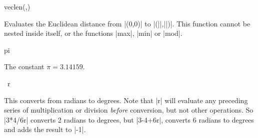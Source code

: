 \begin{math-function}{veclen(,)}

	Evaluates the Euclidean distance from |(0,0)| to |(||,||)|. 
	This function cannot be nested inside itself, or the functions |max|,
	|min| or |mod|.

\begin{codeexample}[post=\tt\footnotesize\pgfmathresult]
\end{codeexample}

\begin{codeexample}[post=\tt\footnotesize\pgfmathresult]
\end{codeexample}

\end{math-function}

\begin{math-constant}{pi}

	The constant $\pi=3.14159$.
	
\begin{codeexample}[post=\tt\footnotesize\pgfmathresult]
\end{codeexample}

\begin{codeexample}[post=\tt\footnotesize\pgfmathresult]
\end{codeexample}

\end{math-constant}

\begin{math-operator}{\ r}

	This converts  from radians to degrees. Note that |r| will 
	evaluate any preceding series of multiplication or division 
	\emph{before} conversion, but not other operations. So |3*4/6r| 
	converts 2 radians to degrees, but |3-4+6r|, converts 6 radians to
	degrees and adds the result to |-1|.

\begin{codeexample}[post=\tt\footnotesize\pgfmathresult]
\end{codeexample}

\begin{codeexample}[post=\tt\footnotesize\pgfmathresult]
\end{codeexample}

\begin{codeexample}[post=\tt\footnotesize\pgfmathresult]
\end{codeexample}

\end{math-operator}

